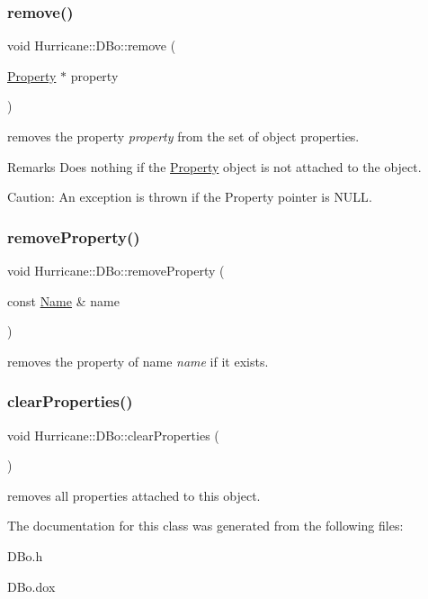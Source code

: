 \subsubsection{\texorpdfstring{remove()}{remove()}}
{\footnotesize\ttfamily void Hurricane\+::\+D\+Bo\+::remove (\begin{DoxyParamCaption}\item[{\mbox{\hyperlink{classHurricane_1_1Property}{Property}} $\ast$}]{property }\end{DoxyParamCaption})}

removes the property {\itshape property} from the set of object properties.

\begin{DoxyRemark}{Remarks}
Does nothing if the \mbox{\hyperlink{classHurricane_1_1Property}{Property}} object is not attached to the object.
\end{DoxyRemark}
\begin{DoxyParagraph}{Caution\+: An exception is thrown if the Property pointer is {\ttfamily N\+U\+LL}.}

\end{DoxyParagraph}
\mbox{\label{classHurricane_1_1DBo_ac35fbb8303b1a78db5ca0fc831fb6a0c}} 
\subsubsection{\texorpdfstring{remove\+Property()}{removeProperty()}}
{\footnotesize\ttfamily void Hurricane\+::\+D\+Bo\+::remove\+Property (\begin{DoxyParamCaption}\item[{const \mbox{\hyperlink{classHurricane_1_1Name}{Name}} \&}]{name }\end{DoxyParamCaption})}

removes the property of name {\itshape name} if it exists. \mbox{\label{classHurricane_1_1DBo_a3e02f3d665cb0b2120df2fdfe9c3df4f}} 
\subsubsection{\texorpdfstring{clear\+Properties()}{clearProperties()}}
{\footnotesize\ttfamily void Hurricane\+::\+D\+Bo\+::clear\+Properties (\begin{DoxyParamCaption}{ }\end{DoxyParamCaption})}

removes all properties attached to this object. 

The documentation for this class was generated from the following files\+:\begin{DoxyCompactItemize}
\item 
D\+Bo.\+h\item 
D\+Bo.\+dox\end{DoxyCompactItemize}
